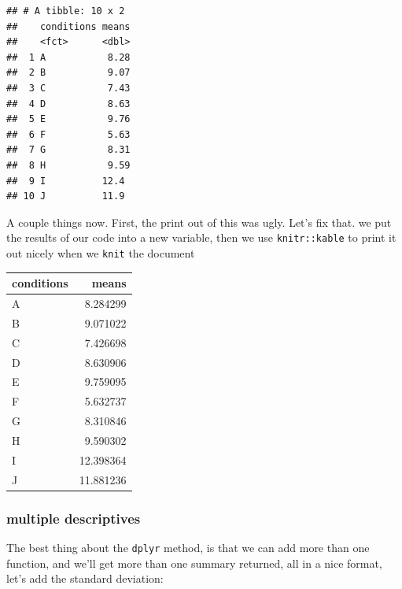 \documentclass[]{book}
\newenvironment{Shaded}{\begin{snugshade}}{\end{snugshade}}
\newcommand{\KeywordTok}[1]{\textcolor[rgb]{0.13,0.29,0.53}{\textbf{{#1}}}}
\newcommand{\DataTypeTok}[1]{\textcolor[rgb]{0.13,0.29,0.53}{{#1}}}
\newcommand{\StringTok}[1]{\textcolor[rgb]{0.31,0.60,0.02}{{#1}}}
\newcommand{\NormalTok}[1]{{#1}}
\theoremstyle{definition}
\theoremstyle{definition}
\theoremstyle{definition}
\theoremstyle{remark}
\begin{document}
\begin{verbatim}
## # A tibble: 10 x 2
##    conditions means
##    <fct>      <dbl>
##  1 A           8.28
##  2 B           9.07
##  3 C           7.43
##  4 D           8.63
##  5 E           9.76
##  6 F           5.63
##  7 G           8.31
##  8 H           9.59
##  9 I          12.4 
## 10 J          11.9
\end{verbatim}

A couple things now. First, the print out of this was ugly. Let's fix
that. we put the results of our code into a new variable, then we use
\texttt{knitr::kable} to print it out nicely when we \texttt{knit} the
document

\begin{Shaded}
\end{Shaded}

\begin{tabular}{l|r}
\hline
conditions & means\\
\hline
A & 8.284299\\
\hline
B & 9.071022\\
\hline
C & 7.426698\\
\hline
D & 8.630906\\
\hline
E & 9.759095\\
\hline
F & 5.632737\\
\hline
G & 8.310846\\
\hline
H & 9.590302\\
\hline
I & 12.398364\\
\hline
J & 11.881236\\
\hline
\end{tabular}

\subsubsection{multiple descriptives}\label{multiple-descriptives}

The best thing about the \texttt{dplyr} method, is that we can add more
than one function, and we'll get more than one summary returned, all in
a nice format, let's add the standard deviation:
\end{document}
